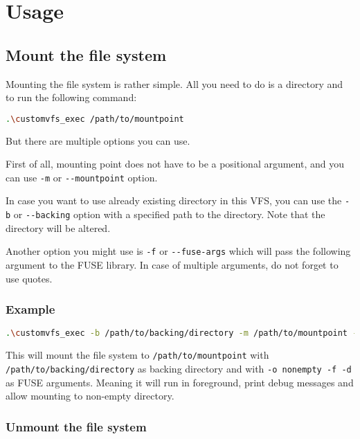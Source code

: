 \chapter{Usage}

\section*{Mount the file system}

Mounting the file system is rather simple.
All you need to do is a directory and to run the following command:

\begin{lstlisting}[language=bash, basicstyle=\ttfamily\small]
  .\customvfs_exec /path/to/mountpoint
\end{lstlisting}

But there are multiple options you can use.

First of all, mounting point does not have to be a positional argument, and you can use \texttt{-m} or \texttt{-{}-mountpoint} option.

In case you want to use already existing directory in this VFS, you can use the \texttt{-b} or \texttt{-{}-backing} option with a specified path to the directory.
Note that the directory will be altered.

Another option you might use is \texttt{-f} or \texttt{-{}-fuse-args} which will pass the following argument to the FUSE library.
In case of multiple arguments, do not forget to use quotes.

\subsection*{Example}

\begin{lstlisting}[language=bash, basicstyle=\ttfamily\small]
  .\customvfs_exec -b /path/to/backing/directory -m /path/to/mountpoint -f "-o nonempty -f -d"
\end{lstlisting}

This will mount the file system to \texttt{/path/to/mountpoint} with \texttt{/path/to/backing/directory} as backing directory and with \texttt{-o nonempty -f -d} as FUSE arguments.
Meaning it will run in foreground, print debug messages and allow mounting to non-empty directory.

\subsection*{Unmount the file system}

